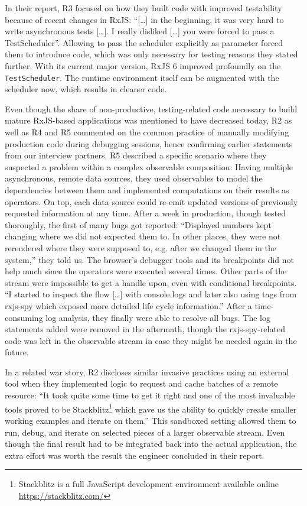 \documentclass[sigplan,screen,review]{acmart}
\begin{document}
In their report, R3 focused on how they built code with improved testability because of recent changes in RxJS: ``[\dots] in the beginning, it was very hard to write asynchronous tests [\dots]. I really disliked [\dots] you were forced to pass a TestScheduler''. Allowing to pass the scheduler explicitly as parameter forced them to introduce code, which was only necessary for testing reasons they stated further. With its current major version, RxJS 6 improved profoundly on the  \texttt{TestScheduler}. The runtime environment itself can be augmented with the scheduler now, which results in cleaner code.

Even though the share of non-productive, testing-related code necessary to build mature RxJS-based applications was mentioned to have decreased today, R2 as well as R4 and R5 commented on the common practice of manually modifying production code during debugging sessions, hence confirming earlier statements from our interview partners. R5 described a specific scenario where they suspected a problem within a complex observable composition: Having multiple asynchronous, remote data sources, they used observables to model the dependencies between them and implemented computations on their results as operators. On top, each data source could re-emit updated versions of previously requested information at any time. After a week in production, though tested thoroughly, the first of many bugs got reported: ``Displayed numbers kept changing where we did not expected them to. In other places, they were not rerendered where they were supposed to, e.g. after we changed them in the system,'' they told us. The browser's debugger tools and its breakpoints did not help much since the operators were executed several times. Other parts of the stream were impossible to get a handle upon, even with conditional breakpoints. ``I started to inspect the flow [\dots] with console.logs and later also using tags from rxjs-spy which exposed more detailed life cycle information.'' After a time-consuming log analysis, they finally were able to resolve all bugs. The log statements added were removed in the aftermath, though the rxjs-spy-related code was left in the observable stream in case they might be needed again in the future.

In a related war story, R2 discloses similar invasive practices using an external tool when they implemented logic to request and cache batches of a remote resource: ``It took quite some time to get it right and one of the most invaluable tools proved to be Stackblitz\footnote{Stackblitz is a full JavaScript development environment available online \url{https://stackblitz.com/}} which gave us the ability to quickly create smaller working examples and iterate on them.'' This sandboxed setting allowed them to run, debug, and iterate on selected pieces of a larger observable stream. Even though the final result had to be integrated back into the actual application, the extra effort was worth the result the engineer concluded in their report.
\end{document}
